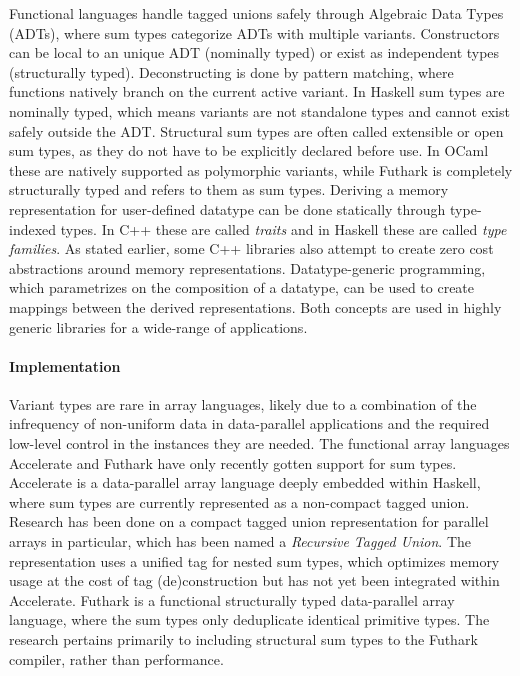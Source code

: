 \documentclass{article}
\begin{document}
Functional languages handle tagged unions safely through Algebraic Data Types (ADTs), where sum types categorize ADTs with multiple variants.
Constructors can be local to an unique ADT (nominally typed) or exist as independent types (structurally typed).
Deconstructing is done by pattern matching, where functions natively branch on the current active variant.
In Haskell sum types are nominally typed, which means variants are not standalone types and cannot exist safely outside the ADT.
Structural sum types are often called extensible or open sum types, as they do not have to be explicitly declared before use.
In OCaml these are natively supported as polymorphic variants\cite{polymorphic-variants}, while Futhark is completely structurally typed and refers to them as sum types\cite{futhark-sum-types}.
Deriving a memory representation for user-defined datatype can be done statically through type-indexed types\cite{type-indexed}\cite{associated-types}.
In C++ these are called {\it traits}\cite{c++traits} and in Haskell these are called {\it type families}\cite{type-families}. 
As stated earlier, some C++ libraries also attempt to create zero cost abstractions around memory representations\cite{llama}\cite{alpaka}.
Datatype-generic programming\cite{datatype-generic-programming}, which parametrizes on the composition of a datatype, can be used to create mappings between the derived representations.
Both concepts are used in highly generic libraries for a wide-range of applications\cite{generic-programming}. 

\paragraph{Implementation}

Variant types are rare in array languages, likely due to a combination of the infrequency of non-uniform data in data-parallel applications and the required low-level control in the instances they are needed.
The functional array languages Accelerate and Futhark have only recently gotten support for sum types\cite{accelerate-sum-types}\cite{futhark-sum-types}.
Accelerate is a data-parallel array language deeply embedded within Haskell, where sum types are currently represented as a non-compact tagged union.
Research has been done on a compact tagged union representation for parallel arrays in particular, which has been named a {\it Recursive Tagged Union}\cite{accelerate-sum-types}.
The representation uses a unified tag for nested sum types, which optimizes memory usage at the cost of tag (de)construction but has not yet been integrated within Accelerate. 
Futhark is a functional structurally typed data-parallel array language, where the sum types only deduplicate identical primitive types.
The research pertains primarily to including structural sum types to the Futhark compiler\cite{futhark-sum-types}, rather than performance.
\end{document}
